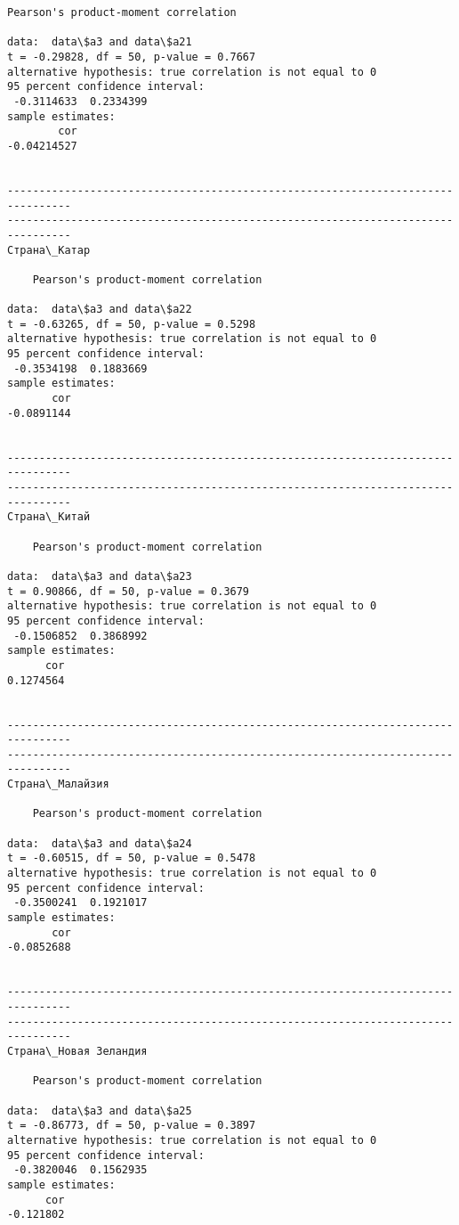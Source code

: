 \documentclass[11pt,mathletters]{article}
\begin{document}
\begin{Verbatim}[commandchars=\\\{\}]
	Pearson's product-moment correlation

data:  data\$a3 and data\$a21
t = -0.29828, df = 50, p-value = 0.7667
alternative hypothesis: true correlation is not equal to 0
95 percent confidence interval:
 -0.3114633  0.2334399
sample estimates:
        cor 
-0.04214527 


--------------------------------------------------------------------------------
--------------------------------------------------------------------------------
Страна\_Катар

	Pearson's product-moment correlation

data:  data\$a3 and data\$a22
t = -0.63265, df = 50, p-value = 0.5298
alternative hypothesis: true correlation is not equal to 0
95 percent confidence interval:
 -0.3534198  0.1883669
sample estimates:
       cor 
-0.0891144 


--------------------------------------------------------------------------------
--------------------------------------------------------------------------------
Страна\_Китай

	Pearson's product-moment correlation

data:  data\$a3 and data\$a23
t = 0.90866, df = 50, p-value = 0.3679
alternative hypothesis: true correlation is not equal to 0
95 percent confidence interval:
 -0.1506852  0.3868992
sample estimates:
      cor 
0.1274564 


--------------------------------------------------------------------------------
--------------------------------------------------------------------------------
Страна\_Малайзия

	Pearson's product-moment correlation

data:  data\$a3 and data\$a24
t = -0.60515, df = 50, p-value = 0.5478
alternative hypothesis: true correlation is not equal to 0
95 percent confidence interval:
 -0.3500241  0.1921017
sample estimates:
       cor 
-0.0852688 


--------------------------------------------------------------------------------
--------------------------------------------------------------------------------
Страна\_Новая Зеландия 

	Pearson's product-moment correlation

data:  data\$a3 and data\$a25
t = -0.86773, df = 50, p-value = 0.3897
alternative hypothesis: true correlation is not equal to 0
95 percent confidence interval:
 -0.3820046  0.1562935
sample estimates:
      cor 
-0.121802 



\end{Verbatim}
\end{document}

